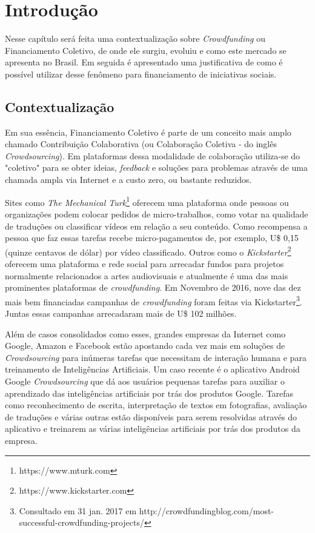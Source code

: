 \chapter{Introdução}

Nesse capítulo será feita uma contextualização sobre \emph{Crowdfunding} ou Financiamento Coletivo, de onde ele surgiu, evoluiu e como este mercado se apresenta no Brasil. Em seguida é apresentado uma justificativa de como é possível utilizar desse fenômeno para financiamento de iniciativas sociais.

\section{Contextualização}


Em sua essência, Financiamento Coletivo é parte de um conceito mais amplo chamado Contribuição Colaborativa (ou Colaboração Coletiva - do inglês \emph{Crowdsourcing}). Em plataformas dessa modalidade de colaboração utiliza-se do "coletivo" para se obter ideias, \emph{feedback} e soluções para problemas através de uma chamada ampla via Internet e a custo zero, ou bastante reduzidos.

Sites como \emph{The Mechanical Turk}\footnote{https://www.mturk.com} oferecem uma plataforma onde pessoas ou organizações podem colocar pedidos de micro-trabalhos, como votar na qualidade de traduções ou classificar vídeos em relação a seu conteúdo. Como recompensa a pessoa que faz essas tarefas recebe micro-pagamentos de, por exemplo, U\$ 0,15 (quinze centavos de dólar) por vídeo classificado. Outros como o \emph{Kickstarter}\footnote{https://www.kickstarter.com} oferecem uma plataforma e rede social para arrecadar fundos para projetos normalmente relacionados a artes audiovisuais e atualmente é uma das mais prominentes plataformas de \emph{crowdfunding}. Em Novembro de 2016, nove das dez mais bem financiadas campanhas de \emph{crowdfunding} foram feitas via Kickstarter\footnote{Consultado em 31 jan. 2017 em http://crowdfundingblog.com/most-successful-crowdfunding-projects/}. Juntas essas campanhas arrecadaram mais de U\$ 102 milhões.

Além de casos consolidados como esses, grandes empresas da Internet como Google, Amazon e Facebook estão apostando cada vez mais em soluções de \emph{Crowdsourcing} para inúmeras tarefas que necessitam de interação humana e para treinamento de Inteligências Artificiais. Um caso recente é o aplicativo Android Google \emph{Crowdsourcing} \cite{cnet-google-crowdsourcing} que dá aos usuários pequenas tarefas para auxiliar o aprendizado das inteligências artificiais por trás dos produtos Google. Tarefas como reconhecimento de escrita, interpretação de textos em fotografias, avaliação de traduções e várias outras estão disponíveis para serem resolvidas através do aplicativo e treinarem as várias inteligências artificiais por trás dos produtos da empresa.

